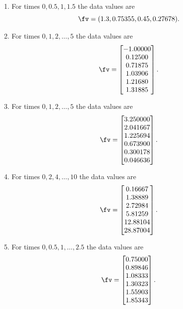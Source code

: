 \begin{reduce}
\begin{exercise}
\begin{enumerate}
\item For times \(0,0.5,1,1.5\) the data values are \[\fv=(1.3, 0.75355, 0.45, 0.27678).\]

\item For times \(0,1,2,\ldots,5\) the data values are 
\setbox\ajrqrbox\hbox{}\marginajrbox%
\[ \fv=\begin{bmatrix} -1.00000
\\ 0.12500
\\ 0.71875
\\ 1.03906
\\ 1.21680
\\ 1.31885 \end{bmatrix}.\]
  
\item For times \(0,1,2,\ldots,5\) the data values are 
\setbox\ajrqrbox\hbox{}\marginajrbox%
\[ \fv=\begin{bmatrix} 3.250000
\\ 2.041667
\\ 1.225694
\\ 0.673900
\\ 0.300178
\\ 0.046636 \end{bmatrix}.\]
  
\item For times \(0,2,4,\ldots,10\) the data values are 
\setbox\ajrqrbox\hbox{}\marginajrbox%
\[ \fv=\begin{bmatrix} 0.16667
\\ 1.38889
\\ 2.72984
\\ 5.81259
\\ 12.88104
\\ 28.87004 \end{bmatrix}.\]
  
\item For times \(0,0.5,1,\ldots,2.5\) the data values are 
\setbox\ajrqrbox\hbox{}\marginajrbox%
\[ \fv=\begin{bmatrix} 0.75000
\\ 0.89846
\\ 1.08333
\\ 1.30323
\\ 1.55903
\\ 1.85343 \end{bmatrix}.\]
  

\end{enumerate}
\end{exercise}
\end{reduce}
